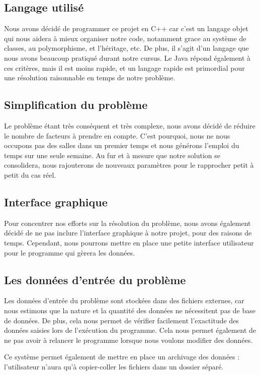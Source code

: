 \documentclass[12pt,a4paper,french]{article}
\begin{document}
\subsection{Langage utilisé}
Nous avons décidé de programmer ce projet en C++ car c'est un langage objet qui nous aidera à mieux organiser notre code, notamment grace au système de classes, au polymorphisme, et l'héritage, etc. De plus, il s'agit d'un langage que nous avons beaucoup pratiqué durant notre cursus.
Le Java répond également à ces critères, mais il est moins rapide, et un langage rapide est primordial pour une résolution raisonnable en temps de notre problème.

\subsection{Simplification du problème}
Le problème étant très conséquent et très complexe, nous avons décidé de réduire le nombre de facteurs à prendre en compte. C'est pourquoi, nous ne nous occupons pas des salles dans un premier temps et nous générons l'emploi du temps sur une seule semaine. Au fur et à mesure que notre solution se consolidera, nous rajouterons de nouveaux paramètres pour le rapprocher petit à petit du cas réel.

\subsection{Interface graphique}
Pour concentrer nos efforts sur la résolution du problème, nous avons également décidé de ne pas inclure l'interface graphique à notre projet, pour des raisons de temps. Cependant, nous pourrons mettre en place une petite interface utilisateur pour le programme qui gèrera les données.

\subsection{Les données d'entrée du problème}
Les données d'entrée du problème sont stockées dans des fichiers externes, car nous estimons que la nature et la quantité des données ne nécessitent pas de base de données. De plus, cela nous permet de vérifier facilement l'exactitude des données saisies lors de l'exécution du programme. Cela nous permet également de ne pas avoir à relancer le programme lorsque nous voulons modifier des données.

Ce système permet également de mettre en place un archivage des données : l'utilisateur n'aura qu'à copier-coller les fichiers dans un dossier séparé.
\end{document}
